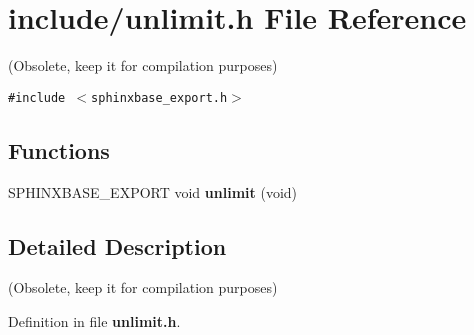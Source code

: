 \section{include/unlimit.h File Reference}
\label{unlimit_8h}
(Obsolete, keep it for compilation purposes)  


{\tt \#include $<$sphinxbase\_\-export.h$>$}\par
\subsection*{Functions}
\begin{CompactItemize}
\item 
SPHINXBASE\_\-EXPORT void \textbf{unlimit} (void)\label{unlimit_8h_0b8bf51305f48eb78ff53ebb8ad27248}

\end{CompactItemize}


\subsection{Detailed Description}
(Obsolete, keep it for compilation purposes) 



Definition in file {\bf unlimit.h}.